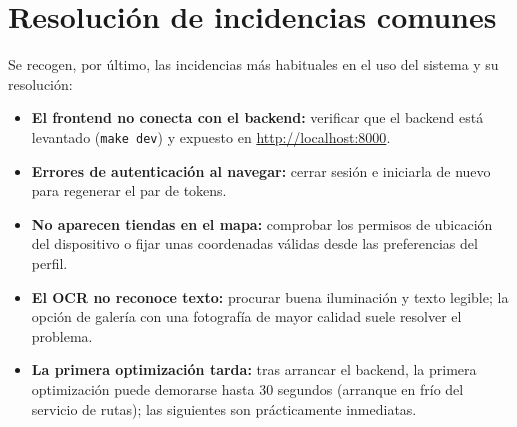 \section{Resoluci\'on de incidencias comunes}\label{sec:manual-incidencias}

Se recogen, por \'ultimo, las incidencias m\'as habituales en el uso del sistema y su
resoluci\'on:

\begin{itemize}
  \item \textbf{El frontend no conecta con el backend:} verificar que el backend est\'a
    levantado (\texttt{make dev}) y expuesto en \url{http://localhost:8000}.
  \item \textbf{Errores de autenticaci\'on al navegar:} cerrar sesi\'on e iniciarla de nuevo
    para regenerar el par de tokens.
  \item \textbf{No aparecen tiendas en el mapa:} comprobar los permisos de ubicaci\'on del
    dispositivo o fijar unas coordenadas v\'alidas desde las preferencias del perfil.
  \item \textbf{El OCR no reconoce texto:} procurar buena iluminaci\'on y texto legible; la
    opci\'on de galer\'ia con una fotograf\'ia de mayor calidad suele resolver el problema.
  \item \textbf{La primera optimizaci\'on tarda:} tras arrancar el backend, la primera
    optimizaci\'on puede demorarse hasta 30 segundos (arranque en fr\'io del servicio de rutas);
    las siguientes son pr\'acticamente inmediatas.
\end{itemize}

